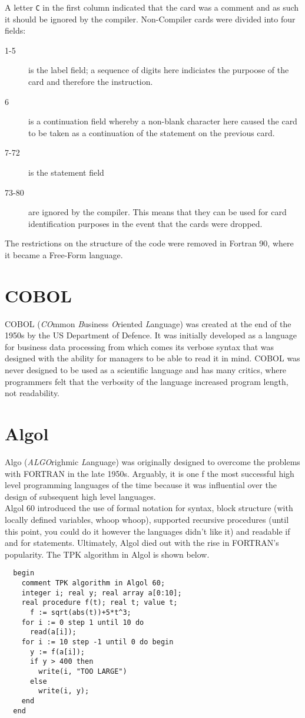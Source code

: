 A letter \verb|C| in the first column indicated that the card was a comment and as such it should be ignored by the compiler. Non-Compiler cards were divided into four fields:
\begin{description}
    \item[1-5] is the label field; a sequence of digits here indiciates the purpoose of the card and therefore the instruction.
    \item[6] is a continuation field whereby a non-blank character here caused the card to be taken as a continuation of the statement on the previous card. 
    \item[7-72] is the statement field
    \item[73-80] are ignored by the compiler. This means that they can be used for card identification purposes in the event that the cards were dropped.
\end{description}

The restrictions on the structure of the code were removed in Fortran 90, where it became a Free-Form language. 

\section{COBOL}
COBOL (\textit{CO}mmon \textit{B}usiness \textit{O}riented \textit{L}anguage) was created at the end of the 1950s by the US Department of Defence. It was initially developed as a language for business data processing from which comes its verbose syntax that was designed with the ability for managers to be able to read it in mind. COBOL was never designed to be used as a scientific language and has many critics, where programmers felt that the verbosity of the language increased program length, not readability. 

\section{Algol}
Algo (\textit{ALGO}righmic \textit{L}anguage) was originally designed to overcome the problems with FORTRAN in the late 1950s. Arguably, it is one f the most successful high level programming languages of the time  because it was influential over the design of subsequent high level languages.\\

Algol 60 introduced the use of formal notation for syntax, block structure (with locally defined variables, whoop whoop), supported recursive procedures (until this point, you could do it however the languages didn't like it) and readable if and for statements. Ultimately, Algol died out with the rise in FORTRAN's popularity. The TPK algorithm in Algol is shown below.
\begin{verbatim}
  begin
    comment TPK algorithm in Algol 60;
    integer i; real y; real array a[0:10];
    real procedure f(t); real t; value t;
      f := sqrt(abs(t))+5*t^3;
    for i := 0 step 1 until 10 do
      read(a[i]);
    for i := 10 step -1 until 0 do begin
      y := f(a[i]);
      if y > 400 then
        write(i, "TOO LARGE")
      else
        write(i, y);
    end
  end
\end{verbatim}

